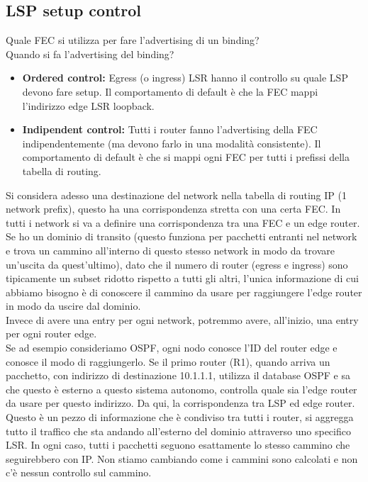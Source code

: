 \documentclass{article}
\begin{document}
\subsection{LSP setup control} Quale FEC si utilizza per fare l'advertising di un binding? \\ Quando si fa l'advertising del binding?
\begin{itemize}
    \item \textbf{Ordered control:} Egress (o ingress) LSR hanno il controllo su quale LSP devono fare setup. Il comportamento di default è che la FEC mappi l'indirizzo edge LSR loopback.
    \item \textbf{Indipendent control:} Tutti i router fanno l'advertising della FEC indipendentemente (ma devono farlo in una modalità consistente). Il comportamento di default è che si mappi ogni FEC per tutti i prefissi della tabella di routing.
\end{itemize}
Si considera adesso una destinazione del network nella tabella di routing IP (1 network prefix), questo ha una corrispondenza stretta con una certa FEC. In tutti i network si va a definire una corrispondenza tra una FEC e un edge router. Se ho un dominio di transito (questo funziona per pacchetti entranti nel network e trova un cammino all'interno di questo stesso network in modo da trovare un'uscita da quest'ultimo), dato che il numero di router (egress e ingress) sono tipicamente un subset ridotto rispetto a tutti gli altri, l'unica informazione di cui abbiamo bisogno è di conoscere il cammino da usare per raggiungere l'edge router in modo da uscire dal dominio. \\ Invece di avere una entry per ogni network, potremmo avere, all'inizio, una entry per ogni router edge. \\ Se ad esempio consideriamo OSPF, ogni nodo conosce l'ID del router edge e conosce il modo di raggiungerlo. Se il primo router (R1), quando arriva un pacchetto, con indirizzo di destinazione 10.1.1.1, utilizza il database OSPF e sa che questo è esterno a questo sistema autonomo, controlla quale sia l'edge router da usare per questo indirizzo. Da qui, la corrispondenza tra LSP ed edge router. \\ Questo è un pezzo di informazione che è condiviso tra tutti i router, si aggregga tutto il traffico che sta andando all'esterno del dominio attraverso uno specifico LSR. In ogni caso, tutti i pacchetti seguono esattamente lo stesso cammino che seguirebbero con IP. Non stiamo cambiando come i cammini sono calcolati e non c'è nessun controllo sul cammino.
\end{document}
